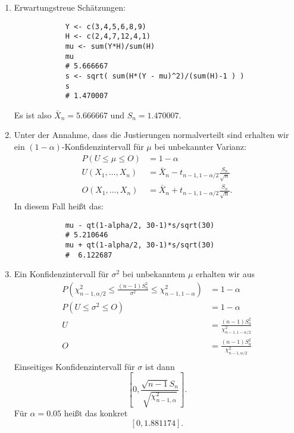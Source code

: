 \solution 
\begin{enumerate}
    \item Erwartungstreue Schätzungen:
        \begin{lstlisting}
            Y <- c(3,4,5,6,8,9) 
            H <- c(2,4,7,12,4,1)
            mu <- sum(Y*H)/sum(H)         
            mu
            # 5.666667
            s <- sqrt( sum(H*(Y - mu)^2)/(sum(H)-1 ) )
            s
            # 1.470007
        \end{lstlisting}
        Es ist also $\bar X_n= 5.666667$ und $S_n = 1.470007$.
    \item Unter der Annahme, dass die Justierungen normalverteilt sind erhalten wir ein
        $(1-\alpha)$-Konfidenzintervall für $\mu$ bei unbekannter Varianz:
        \begin{align*}
            P\left( U \leq \mu \leq O  \right) &= 1-\alpha \\
            U(X_1,\dots ,X_n) &= \bar X_n - t_{n-1, 1-\alpha/2} \frac{S_n}{\sqrt{n}} \\
            O(X_1,\dots ,X_n) &= \bar X_n + t_{n-1, 1-\alpha/2} \frac{S_n}{\sqrt{n}}.
        \end{align*}
        In diesem Fall heißt das:
        \begin{lstlisting}
            mu - qt(1-alpha/2, 30-1)*s/sqrt(30)
            # 5.210646
            mu + qt(1-alpha/2, 30-1)*s/sqrt(30)
            #  6.122687
        \end{lstlisting}
    \item Ein Konfidenzintervall für $\sigma^{2}$ bei unbekanntem $\mu$
        erhalten wir aus
        \begin{align*}
            P\left( 
            \chi^{2}_{n-1, \alpha/2} \leq 
            \frac{(n-1)S^2_n }{\sigma^2} \leq \chi^2_{n-1, 1-\alpha}\right) &=
            1-\alpha \\
            P\left( U \leq \sigma^2 \leq O \right) &= 1-\alpha \\
            U &= \frac{(n-1) S^{2}_{n}}{ \chi^{2}_{n-1, 1-\alpha/2} } \\
            O &= \frac{(n-1) S^{2}_{n}}{ \chi^{2}_{n-1, \alpha/2} } \\
        \end{align*}
        Einseitiges Konfidenzintervall für $\sigma$ ist dann
        \begin{equation*}
            \left[ 0, \frac{\sqrt{n-1} S_n}{ \sqrt{\chi^{2}_{n-1, \alpha}} } \right].
        \end{equation*}
        Für $\alpha=0.05$ heißt das konkret 
        \begin{equation*}
            \left[ 0, 1.881174 \right].
        \end{equation*}
\end{enumerate}


